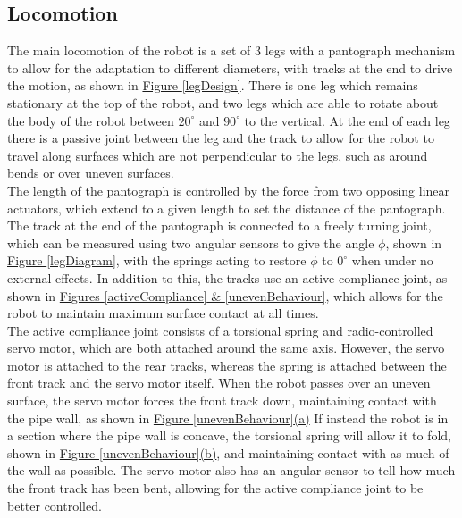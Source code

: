 \documentclass[11pt]{article}		%
\begin{document}
		\subsection{Locomotion}
			
			The main locomotion of the robot is a set of 3 legs with a pantograph mechanism  to allow for the adaptation to different diameters, with tracks at the end to drive the motion, as shown in \hyperref[legDesign]{Figure \ref*{legDesign}}.
			There is one leg which remains stationary at the top of the robot, and two legs which are able to rotate about the body of the robot between $20^\circ$ and $90^\circ$ to the vertical.
			At the end of each leg there is a passive joint between the leg and the track to allow for the robot to travel along surfaces which are not perpendicular to the legs, such as around bends or over uneven surfaces.
			\\
			The length of the pantograph is controlled by the force from two opposing linear actuators, which extend to a given length to set the distance of the pantograph.
			The track at the end of the pantograph is connected to a freely turning joint, which can be measured using two angular sensors to give the angle $\phi$, shown in \hyperref[legDiagram]{Figure \ref*{legDiagram}}, with the springs acting to restore $\phi$ to $0^\circ$ when under no external effects.
			In addition to this, the tracks use an active compliance joint, as shown in \hyperref[activeCompliance]{Figures \ref*{activeCompliance} \& \ref*{unevenBehaviour}}, which allows for the robot to maintain maximum surface contact at all times.
			\\
			The active compliance joint consists of a torsional spring and radio-controlled servo motor, which are both attached around the same axis.
			However, the servo motor is attached to the rear tracks, whereas the spring is attached between the front track and the servo motor itself.
			When the robot passes over an uneven surface, the servo motor forces the front track down, maintaining contact with the pipe wall, as shown in \hyperref[unevenBehaviour]{Figure \ref*{unevenBehaviour}(a)}
			If instead the robot is in a section where the pipe wall is concave, the torsional spring will allow it to fold, shown in \hyperref[unevenBehaviour]{Figure \ref*{unevenBehaviour}(b)}, and maintaining contact with as much of the wall as possible.
			The servo motor also has an angular sensor to tell how much the front track has been bent, allowing for the active compliance joint to be better controlled.
\end{document}
